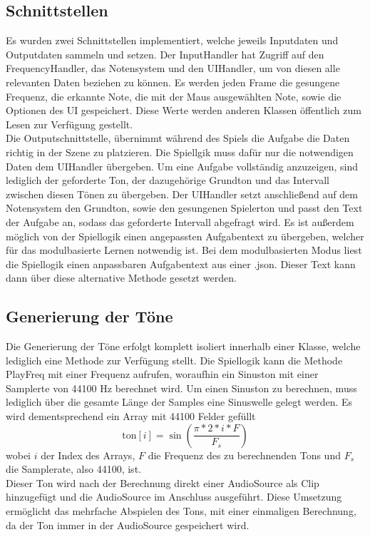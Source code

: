 \subsection*{Schnittstellen}
Es wurden zwei Schnittstellen implementiert, welche jeweils Inputdaten und Outputdaten sammeln und setzen. Der InputHandler hat Zugriff auf den FrequencyHandler, das Notensystem und den UIHandler, um von diesen alle relevanten Daten beziehen zu können. Es werden jeden Frame die gesungene Frequenz, die erkannte Note, die mit der Maus ausgewählten Note, sowie die Optionen des UI gespeichert. Diese Werte werden anderen Klassen öffentlich zum Lesen zur Verfügung gestellt. \\
Die Outputschnittstelle, übernimmt während des Spiels die Aufgabe die Daten richtig in der Szene zu platzieren. Die Spiellgik muss dafür nur die notwendigen Daten dem UIHandler übergeben. Um eine Aufgabe vollständig anzuzeigen, sind lediglich der geforderte Ton, der dazugehörige Grundton und das Intervall zwischen diesen Tönen zu übergeben. Der UIHandler setzt anschließend auf dem Notensystem den Grundton, sowie den gesungenen Spielerton und passt den Text der Aufgabe an, sodass das geforderte Intervall abgefragt wird. Es ist außerdem möglich von der Spiellogik einen angepassten Aufgabentext zu übergeben, welcher für das modulbasierte Lernen notwendig ist. Bei dem modulbasierten Modus liest die Spiellogik einen anpassbaren Aufgabentext aus einer .json. Dieser Text kann dann über diese alternative Methode gesetzt werden. 

\subsection*{Generierung der Töne}
Die Generierung der Töne erfolgt komplett isoliert innerhalb einer Klasse, welche lediglich eine Methode zur Verfügung stellt. Die Spiellogik kann die Methode PlayFreq mit einer Frequenz aufrufen, woraufhin ein Sinuston mit einer Samplerte von 44100 Hz berechnet wird. Um einen Sinuston zu berechnen, muss lediglich über die gesamte Länge der Samples eine Sinuswelle gelegt werden. Es wird dementsprechend ein Array mit 44100 Felder gefüllt
$$\text{ton}[i] = \sin(\frac{\pi * 2 * i * F}{F_s})$$ 
wobei $i$ der Index des Arrays, $F$ die Frequenz des zu berechnenden Tons und $F_s$ die Samplerate, also 44100, ist.\\
Dieser Ton wird nach der Berechnung direkt einer AudioSource als Clip hinzugefügt und die AudioSource im Anschluss ausgeführt. Diese Umsetzung ermöglicht das mehrfache Abspielen des Tons, mit einer einmaligen Berechnung, da der Ton immer in der AudioSource gespeichert wird. 

